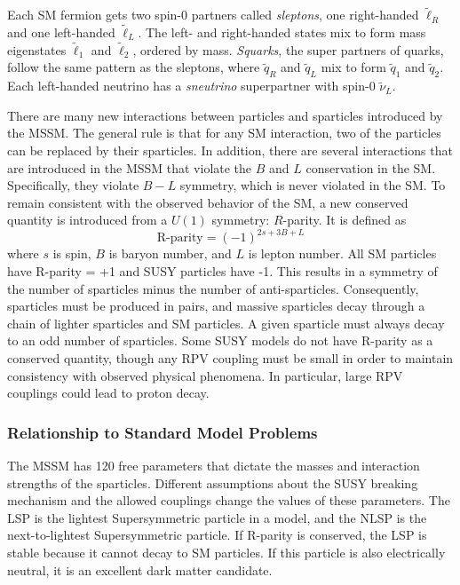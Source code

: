 Each \ac{SM} fermion gets two spin-0 partners called \emph{sleptons}, one right-handed $\tilde{\ell}_{R}$ and one left-handed $\tilde{\ell}_{L}$. The left- and right-handed states mix to form mass eigenstates $\tilde{\ell}_{1}$ and $\tilde{\ell}_{2}$, ordered by mass. \emph{Squarks}, the super partners of quarks, follow the same pattern as the sleptons, where $\tilde{q}_{R}$ and $\tilde{q}_{L}$ mix to form $\tilde{q}_{1}$ and $\tilde{q}_{2}$. Each left-handed neutrino has a \emph{sneutrino} superpartner with spin-0 $\tilde{\nu}_{L}$.

There are many new interactions between particles and sparticles introduced by the \ac{MSSM}. The general rule is that for any \ac{SM} interaction, two of the particles can be replaced by their sparticles. In addition, there are several interactions that are introduced in the \ac{MSSM} that violate the $B$ and $L$ conservation in the \ac{SM}. Specifically, they violate $B-L$ symmetry, which is never violated in the \ac{SM}. To remain consistent with the observed behavior of the \ac{SM}, a new conserved quantity is introduced from a $U(1)$ symmetry: $R$-parity. It is defined as
\begin{equation}
\text{R-parity} = (-1)^{2s+ 3B+L}
\end{equation}
where $s$ is spin, $B$ is baryon number, and $L$ is lepton number. All \ac{SM} particles have R-parity = +1 and \ac{SUSY} particles have -1. This results in a symmetry of the number of sparticles minus the number of anti-sparticles. Consequently, sparticles must be produced in pairs, and massive sparticles decay through a chain of lighter sparticles and \ac{SM} particles. A given sparticle must always decay to an odd number of sparticles. Some \ac{SUSY} models do not have R-parity as a conserved quantity, though any \acf{RPV} coupling must be small in order to maintain consistency with observed physical phenomena. In particular, large \ac{RPV} couplings could lead to proton decay. 


\subsubsection{Relationship to Standard Model Problems}

The \ac{MSSM} has 120 free parameters that dictate the masses and interaction strengths of the sparticles. Different assumptions about the \ac{SUSY} breaking mechanism and the allowed couplings change the values of these parameters. The LSP is the lightest Supersymmetric particle in a model, and the NLSP is the next-to-lightest Supersymmetric particle. If R-parity is conserved, the \ac{LSP} is stable because it cannot decay to \ac{SM} particles. If this particle is also electrically neutral, it is an excellent dark matter candidate.


